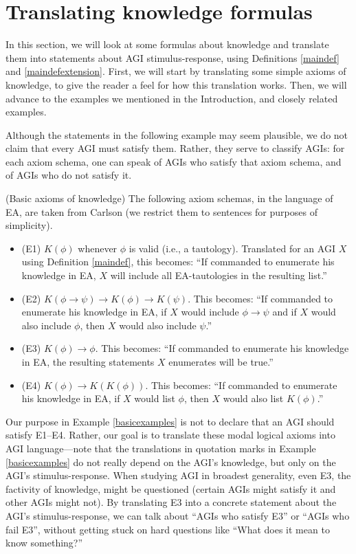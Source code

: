 \documentclass[runningheads]{llncs}
\begin{document}
\section{Translating knowledge formulas}
\label{appsection}

In this section, we will look at some formulas about knowledge and translate them into
statements about AGI stimulus-response, using
Definitions \ref{maindef} and \ref{maindefextension}.
First, we will start by translating some simple axioms of knowledge, to give the reader
a feel for how this translation works. Then, we will advance to the examples we mentioned
in the Introduction, and closely related examples.

Although the statements in the following example may seem plausible,
we do not claim that every AGI must satisfy them. Rather, they serve to classify AGIs:
for each axiom schema, one can speak of AGIs who satisfy that axiom schema, and
of AGIs who do not satisfy it.

\begin{example}
\label{basicexamples}
  (Basic axioms of knowledge) The following axiom schemas, in the language
  of EA, are taken from Carlson \cite{carlson}
  (we restrict them to sentences for purposes of simplicity).
  \begin{itemize}
    \item (E1) $K(\phi)$ whenever $\phi$ is valid (i.e., a tautology).
    Translated for an AGI $X$ using Definition \ref{maindef}, this becomes:
    ``If commanded to enumerate his knowledge in EA, $X$ will include
    all EA-tautologies in the resulting list.''
    \item (E2) $K(\phi\rightarrow\psi)\rightarrow K(\phi)\rightarrow K(\psi)$.
    This becomes: ``If commanded to enumerate his knowledge in EA,
    if $X$ would include $\phi\rightarrow\psi$ and if $X$ would also include
    $\phi$, then $X$ would also include $\psi$.''
    \item (E3) $K(\phi)\rightarrow\phi$. This becomes: ``If commanded to enumerate
    his knowledge in EA, the resulting statements $X$ enumerates
    will be true.''
    \item (E4) $K(\phi)\rightarrow K(K(\phi))$. This becomes: ``If commanded to
    enumerate his knowledge in EA, if $X$ would list $\phi$,
    then $X$ would also list $K(\phi)$.''
  \end{itemize}
\end{example}

Our purpose in Example \ref{basicexamples} is not to declare that an
AGI should satisfy E1--E4. Rather, our goal is to translate these
modal logical axioms into AGI language---note that the translations in quotation
marks in Example \ref{basicexamples} do not really depend on
the AGI's knowledge, but only on the AGI's stimulus-response.
When studying AGI in broadest generality,
even E3, the factivity of knowledge, might be questioned (certain AGIs might satisfy
it and other AGIs might not). By translating E3 into
a concrete statement about the AGI's stimulus-response,
we can talk about ``AGIs who satisfy E3'' or
``AGIs who fail E3'', without getting stuck on hard questions
like ``What does it mean to know something?''
\end{document}
